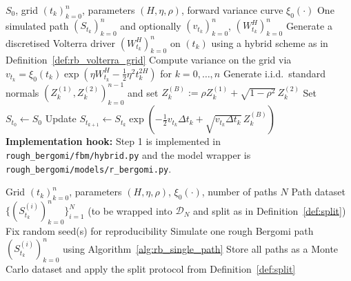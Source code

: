 \documentclass[12pt,a4paper]{article}
\theoremstyle{definition}
\theoremstyle{plain}
\theoremstyle{remark}
\theoremstyle{plain}
\begin{document}
\begin{algorithm}[H]
\caption{Simulating one rough Bergomi path on a grid (hybrid driver)}
\label{alg:rb_single_path}
\begin{algorithmic}[1]
\Require $S_0$, grid $(t_k)_{k=0}^n$, parameters $(H,\eta,\rho)$, forward variance curve $\xi_0(\cdot)$
\Ensure One simulated path $(S_{t_k})_{k=0}^n$ and optionally $(v_{t_k})_{k=0}^n$, $(W^H_{t_k})_{k=0}^n$
\State Generate a discretised Volterra driver $(W^H_{t_k})_{k=0}^n$ on $(t_k)$ using a hybrid scheme as in Definition~\ref{def:rb_volterra_grid}
\State Compute variance on the grid via $v_{t_k}=\xi_0(t_k)\exp(\eta W^H_{t_k}-\tfrac12\eta^2 t_k^{2H})$ for $k=0,\dots,n$
\State Generate i.i.d.\ standard normals $(Z_k^{(1)},Z_k^{(2)})_{k=0}^{n-1}$ and set $Z_k^{(B)}:=\rho Z_k^{(1)}+\sqrt{1-\rho^2}\,Z_k^{(2)}$
\State Set $S_{t_0}\gets S_0$
    \State Update $S_{t_{k+1}}\gets S_{t_k}\exp(-\tfrac12 v_{t_k}\Delta t_k+\sqrt{v_{t_k}\Delta t_k}\,Z_k^{(B)})$
\EndFor
\Statex \textbf{Implementation hook:} Step 1 is implemented in \texttt{rough\_bergomi/fbm/hybrid.py} and the model wrapper is \texttt{rough\_bergomi/models/r\_bergomi.py}.
\end{algorithmic}
\end{algorithm}

\begin{algorithm}[H]
\caption{Vectorised rough Bergomi dataset generation (paths only)}
\label{alg:rb_dataset_generation}
\begin{algorithmic}[1]
\Require Grid $(t_k)_{k=0}^n$, parameters $(H,\eta,\rho)$, $\xi_0(\cdot)$, number of paths $N$
\Ensure Path dataset $\{(S^{(i)}_{t_k})_{k=0}^n\}_{i=1}^N$ (to be wrapped into $\mathcal{D}_N$ and split as in Definition~\ref{def:split})
\State Fix random seed(s) for reproducibility
    \State Simulate one rough Bergomi path $(S^{(i)}_{t_k})_{k=0}^n$ using Algorithm~\ref{alg:rb_single_path}
\EndFor
\State Store all paths as a Monte Carlo dataset and apply the split protocol from Definition~\ref{def:split}
\end{algorithmic}
\end{algorithm}
\end{document}
